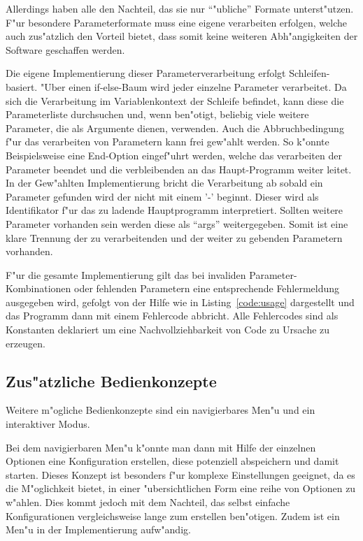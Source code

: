 Allerdings haben alle den Nachteil, das sie nur "`"ubliche"' Formate unterst"utzen. F"ur besondere Parameterformate muss eine eigene verarbeiten erfolgen, welche auch zus"atzlich den Vorteil bietet, dass somit keine weiteren Abh"angigkeiten der Software geschaffen werden.

Die eigene Implementierung dieser Parameterverarbeitung erfolgt Schleifen-basiert. "Uber einen if-else-Baum wird jeder einzelne Parameter verarbeitet. Da sich die Verarbeitung im Variablenkontext der Schleife befindet, kann diese die Parameterliste durchsuchen und, wenn ben"otigt, beliebig viele weitere Parameter, die als Argumente dienen, verwenden. Auch die Abbruchbedingung f"ur das verarbeiten von Parametern kann frei gew"ahlt werden. So k"onnte Beispielsweise eine End-Option eingef"uhrt werden, welche das verarbeiten der Parameter beendet und die verbleibenden an das Haupt-Programm weiter leitet. In der Gew"ahlten Implementierung bricht die Verarbeitung ab sobald ein Parameter gefunden wird der nicht mit einem '-' beginnt. Dieser wird als Identifikator f"ur das zu ladende Hauptprogramm interpretiert. Sollten weitere Parameter vorhanden sein werden diese als "`args"' weitergegeben. Somit ist eine klare Trennung der zu verarbeitenden und der weiter zu gebenden Parametern vorhanden.

F"ur die gesamte Implementierung gilt das bei invaliden Parameter-Kombinationen oder fehlenden Parametern eine entsprechende Fehlermeldung ausgegeben wird, gefolgt von der Hilfe wie in Listing~\ref{code:usage} dargestellt und das Programm dann mit einem Fehlercode abbricht. Alle Fehlercodes sind als Konstanten deklariert um eine Nachvollziehbarkeit von Code zu Ursache zu erzeugen.

 

\subsection{Zus"atzliche Bedienkonzepte}

Weitere m"ogliche Bedienkonzepte sind ein navigierbares Men"u und ein interaktiver Modus.

Bei dem navigierbaren Men"u k"onnte man dann mit Hilfe der einzelnen Optionen eine Konfiguration erstellen, diese potenziell abspeichern und damit starten. Dieses Konzept ist besonders f"ur komplexe Einstellungen geeignet, da es die M"oglichkeit bietet, in einer "ubersichtlichen Form eine reihe von Optionen zu w"ahlen. Dies kommt jedoch mit dem Nachteil, das selbst einfache Konfigurationen vergleichsweise lange zum erstellen ben"otigen. Zudem ist ein Men"u in der Implementierung aufw"andig.

